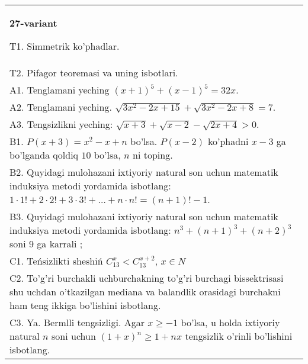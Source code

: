 \documentclass{article}
\begin{document}
\begin{tabular}{m{17cm}}
\textbf{27-variant}
\newline

T1. Simmetrik ko'phadlar. \\
T2. Pifagor teoremasi va uning isbotlari. \\
A1. Tenglamani yeching \((x + 1)^{5} + (x - 1)^{5} = 32x\). \\
A2. Tenglamani yeching. \(\sqrt{3x^{2} - 2x + 15} + \sqrt{3x^{2} - 2x + 8} = 7\). \\
A3. Tengsizlikni yeching: \(\sqrt{x + 3} + \sqrt{x - 2} - \sqrt{2x + 4} > 0\). \\
B1. \(P(x + 3) = x^{2} - x + n\) bo'lsa. \(P(x - 2)\) ko'phadni \(x - 3\) ga bo'lganda qoldiq \(10\) bo'lsa, \(n\) ni toping. \\
B2. Quyidagi mulohazani ixtiyoriy natural son uchun matematik induksiya metodi yordamida isbotlang: \(1 \cdot 1! + 2 \cdot 2! + 3 \cdot 3! + \ldots + n \cdot n! = (n + 1)! - 1\). \\
B3. Quyidagi mulohazani ixtiyoriy natural son uchun matematik induksiya metodi yordamida isbotlang: \(n^{3} + (n + 1)^{3} + (n + 2)^{3}\) soni 9 ga karrali ; \\
C1. Teńsizlikti sheshiń \(C_{13}^{x} < C_{13}^{x + 2}\), \(x \in N\) \\
C2. To'g'ri burchakli uchburchakning to'g'ri burchagi bissektrisasi shu uchdan o'tkazilgan mediana va balandlik orasidagi burchakni ham teng ikkiga bo'lishini isbotlang. \\
C3. Ya. Bermlli tengsizligi. Agar \(x \geq - 1\) bo'lsa, u holda ixtiyoriy natural \(n\) soni uchun \((1 + x)^{n} \geq 1 + nx\) tengsizlik o'rinli bo'lishini isbotlang. \\

\end{tabular}
\vspace{1cm}
\end{document}
